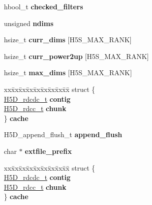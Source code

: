 \begin{DoxyCompactItemize}
hbool\+\_\+t {\bfseries checked\+\_\+filters}
\item 
\mbox{\label{struct_h5_d__shared__t_aee1e80adfbc30b6f401657a63c668d50}} 
unsigned {\bfseries ndims}
\item 
\mbox{\label{struct_h5_d__shared__t_a33eed42a8bffeba19ed5659ef0ed5a49}} 
hsize\+\_\+t {\bfseries curr\+\_\+dims} \mbox{[}H5\+S\+\_\+\+M\+A\+X\+\_\+\+R\+A\+NK\mbox{]}
\item 
\mbox{\label{struct_h5_d__shared__t_a222b1c4cdf287eb1a7cdc4d015086675}} 
hsize\+\_\+t {\bfseries curr\+\_\+power2up} \mbox{[}H5\+S\+\_\+\+M\+A\+X\+\_\+\+R\+A\+NK\mbox{]}
\item 
\mbox{\label{struct_h5_d__shared__t_a622c0d0b58a58623efd13d10637c91f2}} 
hsize\+\_\+t {\bfseries max\+\_\+dims} \mbox{[}H5\+S\+\_\+\+M\+A\+X\+\_\+\+R\+A\+NK\mbox{]}
\item 
\mbox{\label{struct_h5_d__shared__t_a80829c20c28436aa2db21faf3356fc5a}} 
\begin{tabbing}
xx\=xx\=xx\=xx\=xx\=xx\=xx\=xx\=xx\=\kill
struct \{\\
\>\hyperlink{struct_h5_d__rdcdc__t}{H5D\_rdcdc\_t} {\bfseries contig}\\
\>\hyperlink{struct_h5_d__rdcc__t}{H5D\_rdcc\_t} {\bfseries chunk}\\
\} {\bfseries cache}\\

\end{tabbing}\item 
\mbox{\label{struct_h5_d__shared__t_ae8f86e0fae0445b51e3ff936c625a369}} 
H5\+D\+\_\+append\+\_\+flush\+\_\+t {\bfseries append\+\_\+flush}
\item 
\mbox{\label{struct_h5_d__shared__t_ab9f26156efe52f64bf4f43d4ae8b3bee}} 
char $\ast$ {\bfseries extfile\+\_\+prefix}
\item 
\mbox{\label{struct_h5_d__shared__t_a76039780fa77f92fae29e4ecad786e5c}} 
\begin{tabbing}
xx\=xx\=xx\=xx\=xx\=xx\=xx\=xx\=xx\=\kill
struct \{\\
\>\hyperlink{struct_h5_d__rdcdc__t}{H5D\_rdcdc\_t} {\bfseries contig}\\
\>\hyperlink{struct_h5_d__rdcc__t}{H5D\_rdcc\_t} {\bfseries chunk}\\
\} {\bfseries cache}\\

\end{tabbing}\end{DoxyCompactItemize}



